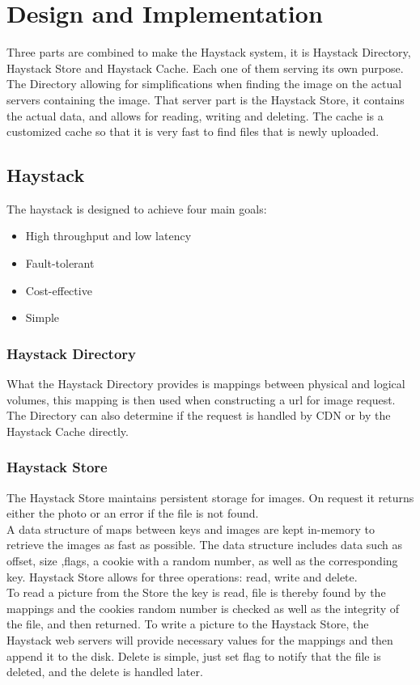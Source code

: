 \section{Design and Implementation}
 Three parts are combined to make the Haystack system, it is
 Haystack Directory, Haystack Store and Haystack Cache.
 Each one of them serving its own purpose. The Directory allowing for
 simplifications when finding the image on the actual servers containing the
 image. That server part is the Haystack Store, it contains the actual data, and
 allows for reading, writing and deleting. The cache is a customized cache so that
 it is very fast to find files that is newly uploaded.

\subsection{Haystack}
The haystack is designed to achieve four main goals:
\begin{itemize}
  \item High throughput and low latency
  \item Fault-tolerant
  \item Cost-effective
  \item Simple
\end{itemize} 

\subsubsection{Haystack Directory}
  What the Haystack Directory provides is mappings between physical and logical
  volumes, this mapping is then used when constructing a url for image request.
  The Directory can also determine if the request is handled by CDN or by the 
  Haystack Cache directly. 
  
\subsubsection{Haystack Store}
 The Haystack Store maintains persistent storage for images. On request it returns
 either the photo or an error if the file is not found. \\
 A data structure of maps between keys and images are kept in-memory to retrieve
 the images as fast as possible. The data structure includes data such as offset,
 size ,flags, a cookie with a random number, as well as the corresponding key. 
 Haystack Store allows for three operations: read, write and delete.\\
 To read a picture from the Store the key is read, file is thereby found by the mappings
 and the cookies random number is checked as well as the integrity of the file, and then
 returned. To write a picture to the Haystack Store, the Haystack web servers will provide
 necessary values for the mappings and then append it to the disk.
 Delete is simple, just set flag to notify that the file is deleted, and the delete
 is handled later.
  
